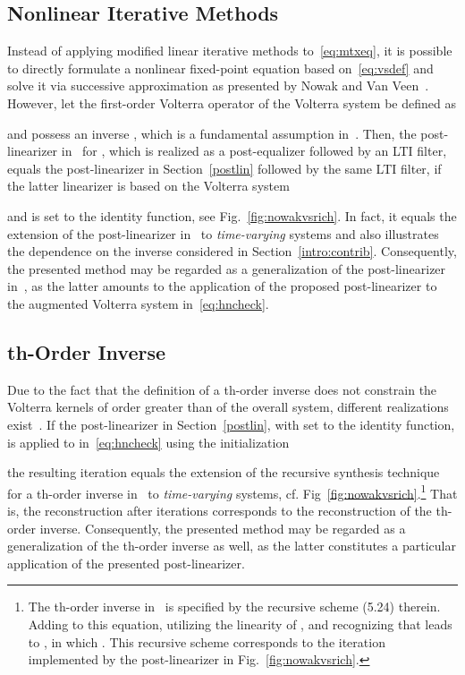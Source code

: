 \documentclass[10pt,twocolumn,twoside]{IEEEtran}
\begin{document}
\subsection{Nonlinear Iterative Methods}

Instead of applying modified linear iterative methods to~\eqref{eq:mtxeq},
it is possible to directly formulate a nonlinear fixed-point equation
based on~\eqref{eq:vsdef} and solve it via successive approximation as
presented by Nowak and Van Veen~\cite{nowak1997}. However, let the
first-order Volterra operator 
of the Volterra system  be defined as

and possess an inverse ,
which is a fundamental assumption in~\cite{nowak1997}.
Then, the post-linearizer in~\cite{nowak1997} for , which is realized as a
post-equalizer followed by an LTI filter, equals
the post-linearizer in Section~\ref{postlin} followed by the same LTI filter,
if the latter linearizer is based on the Volterra system

and  is set to the identity function, see Fig.~\ref{fig:nowakvsrich}.
In fact, it equals the extension of the post-linearizer in~\cite{nowak1997}
to \emph{time-varying} systems and also illustrates the dependence on the inverse
 considered in Section~\ref{intro:contrib}.
Consequently, the presented method may be regarded as a generalization
of the post-linearizer in~\cite{nowak1997}, as the latter amounts to the application
of the proposed post-linearizer to the augmented Volterra system  in~\eqref{eq:hncheck}.

\subsection{th-Order Inverse}

Due to the fact that the definition of a th-order inverse does
not constrain the Volterra kernels of order greater than  of the
overall system, different realizations exist~\cite{schetzen1976,sarti1992,kafka2002}.
If the post-linearizer in Section~\ref{postlin}, with  set to the identity
function, is applied to  in~\eqref{eq:hncheck} using the initialization

the resulting iteration equals the extension of the recursive synthesis technique for a
th-order inverse in~\cite[ch.~5.2.3]{kafka2002} to \emph{time-varying} systems,
cf. Fig~\ref{fig:nowakvsrich}.\footnote{The th-order inverse
in~\cite{kafka2002} is specified by the recursive scheme (5.24) therein. Adding
 to this equation, utilizing the
linearity of , and recognizing that  leads to
,
in which . This
recursive scheme corresponds to the iteration implemented by the post-linearizer in
Fig.~\ref{fig:nowakvsrich}.}
That is, the reconstruction after  iterations corresponds to the reconstruction
of the th-order inverse. Consequently, the
presented method may be regarded as a generalization of the th-order inverse
as well, as the latter constitutes a particular application of the presented post-linearizer.
\end{document}

